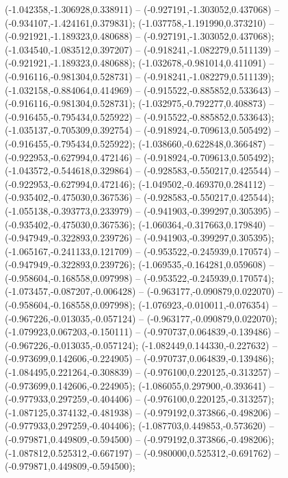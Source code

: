  (-1.042358,-1.306928,0.338911) -- (-0.927191,-1.303052,0.437068) -- (-0.934107,-1.424161,0.379831);
 (-1.037758,-1.191990,0.373210) -- (-0.921921,-1.189323,0.480688) -- (-0.927191,-1.303052,0.437068);
 (-1.034540,-1.083512,0.397207) -- (-0.918241,-1.082279,0.511139) -- (-0.921921,-1.189323,0.480688);
 (-1.032678,-0.981014,0.411091) -- (-0.916116,-0.981304,0.528731) -- (-0.918241,-1.082279,0.511139);
 (-1.032158,-0.884064,0.414969) -- (-0.915522,-0.885852,0.533643) -- (-0.916116,-0.981304,0.528731);
 (-1.032975,-0.792277,0.408873) -- (-0.916455,-0.795434,0.525922) -- (-0.915522,-0.885852,0.533643);
 (-1.035137,-0.705309,0.392754) -- (-0.918924,-0.709613,0.505492) -- (-0.916455,-0.795434,0.525922);
 (-1.038660,-0.622848,0.366487) -- (-0.922953,-0.627994,0.472146) -- (-0.918924,-0.709613,0.505492);
 (-1.043572,-0.544618,0.329864) -- (-0.928583,-0.550217,0.425544) -- (-0.922953,-0.627994,0.472146);
 (-1.049502,-0.469370,0.284112) -- (-0.935402,-0.475030,0.367536) -- (-0.928583,-0.550217,0.425544);
 (-1.055138,-0.393773,0.233979) -- (-0.941903,-0.399297,0.305395) -- (-0.935402,-0.475030,0.367536);
 (-1.060364,-0.317663,0.179840) -- (-0.947949,-0.322893,0.239726) -- (-0.941903,-0.399297,0.305395);
 (-1.065167,-0.241133,0.121709) -- (-0.953522,-0.245939,0.170574) -- (-0.947949,-0.322893,0.239726);
 (-1.069535,-0.164281,0.059608) -- (-0.958604,-0.168558,0.097998) -- (-0.953522,-0.245939,0.170574);
 (-1.073457,-0.087207,-0.006428) -- (-0.963177,-0.090879,0.022070) -- (-0.958604,-0.168558,0.097998);
 (-1.076923,-0.010011,-0.076354) -- (-0.967226,-0.013035,-0.057124) -- (-0.963177,-0.090879,0.022070);
 (-1.079923,0.067203,-0.150111) -- (-0.970737,0.064839,-0.139486) -- (-0.967226,-0.013035,-0.057124);
 (-1.082449,0.144330,-0.227632) -- (-0.973699,0.142606,-0.224905) -- (-0.970737,0.064839,-0.139486);
 (-1.084495,0.221264,-0.308839) -- (-0.976100,0.220125,-0.313257) -- (-0.973699,0.142606,-0.224905);
 (-1.086055,0.297900,-0.393641) -- (-0.977933,0.297259,-0.404406) -- (-0.976100,0.220125,-0.313257);
 (-1.087125,0.374132,-0.481938) -- (-0.979192,0.373866,-0.498206) -- (-0.977933,0.297259,-0.404406);
 (-1.087703,0.449853,-0.573620) -- (-0.979871,0.449809,-0.594500) -- (-0.979192,0.373866,-0.498206);
 (-1.087812,0.525312,-0.667197) -- (-0.980000,0.525312,-0.691762) -- (-0.979871,0.449809,-0.594500);
